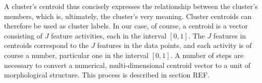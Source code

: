 A cluster's centroid thus concisely expresses the relationship between the cluster's members, which is, ultimately, the cluster's very meaning. Cluster centroids can therefore be used as cluster labels. In our case, of course, a centroid is a vector consisting of $J$ feature activities, each in the interval $[0,1]$. The $J$ features in centroids correspond to the $J$ features in the data points, and each activity is of course a number, particular one in the interval $[0,1]$. 
A number of steps are necessary to convert a numerical, multi-dimensional centroid vector to a unit of morphological structure. This process is described in section REF.

%
